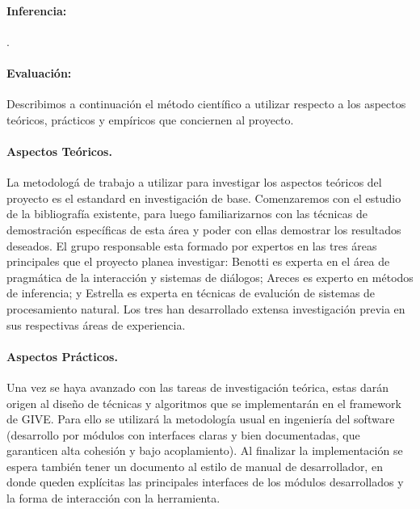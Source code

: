 \paragraph{Inferencia:}
\citep{arec:logi00}.


\paragraph{Evaluaci\'on:}



Describimos a continuaci\'on el m\'etodo cient\'ifico a utilizar
respecto a los aspectos te\'oricos, pr\'acticos y emp\'iricos
que conciernen al proyecto.

\paragraph{Aspectos Te\'oricos.}
La metodolog\'a de trabajo a utilizar para investigar los aspectos
te\'oricos del proyecto es el estandard en investigaci\'on de base.
Comenzaremos con el estudio de la bibliograf\'ia existente, para luego
familiarizarnos con las t\'ecnicas de demostraci\'on espec\'ificas de esta
\'area y poder con ellas demostrar los resultados deseados. El grupo
responsable esta formado por expertos en las tres \'areas principales
que el proyecto planea investigar: Benotti es experta en el \'area de
pragm\'atica de la interacci\'on y sistemas de di\'alogos; Areces es
experto en m\'etodos de inferencia; y Estrella es experta en t\'ecnicas
de evaluci\'on de sistemas de procesamiento natural.
Los tres han desarrollado extensa investigaci\'on previa en sus respectivas
\'areas
de experiencia.

\paragraph{Aspectos Pr\'acticos.}
Una vez se haya avanzado con las tareas de investigaci\'on te\'orica,
estas dar\'an origen al dise\~no de t\'ecnicas y algoritmos que se
implementar\'an en el framework de GIVE. Para ello se utilizar\'a la
metodolog\'ia
usual en ingenier\'ia del software (desarrollo por
m\'odulos con interfaces claras y bien documentadas,
que garanticen alta cohesi\'on y bajo acoplamiento).
Al finalizar la implementaci\'on
se espera tambi\'en tener un documento al estilo de manual de
desarrollador, en donde queden expl\'icitas las principales interfaces
de los m\'odulos desarrollados y la forma de interacci\'on con la
herramienta.


